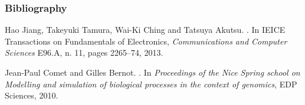 
\begin{frame}[c]
\frametitle{Bibliography}

\small
\setlength{\parskip}{0.5em}

\tcitebullet Hao Jiang, Takeyuki Tamura, Wai-Ki Ching and Tatsuya Akutsu.
.
In IEICE Transactions on Fundamentals of Electronics, \textit{Communications and Computer Sciences} E96.A, n. 11, pages 2265--74, 2013.

\tcitebullet Jean-Paul Comet and Gilles Bernot.
.
In \textit{Proceedings of the Nice Spring school on Modelling and simulation of biological processes in the context of genomics},
EDP Sciences, 2010.

\end{frame}



